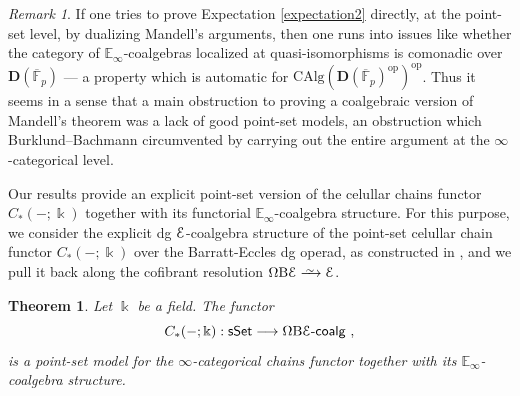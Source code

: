 \documentclass[a4paper,12pt]{amsart}
\renewcommand{\mathcal}{\EuScript}
\newtheorem{theoremintro}{Theorem}
\theoremstyle{plain}
\theoremstyle{definition}
\theoremstyle{remark}
\newtheorem{remark}[theorem]{\sc Remark}%
\newcommand{\qi}{\xrightarrow{ \,\smash{\raisebox{-0.65ex}{\ensuremath{\scriptstyle\sim}}}\,}}
\newcommand{\kk}{\Bbbk}
\begin{document}
\begin{remark}If one tries to prove Expectation \ref{expectation2} directly, at the point-set level, by dualizing Mandell's arguments, then one runs into issues like whether the category of $\mathbb E_\infty$-coalgebras localized at quasi-isomorphisms is comonadic over $\mathbf D(\overline{\mathbb{F}}_p)$ --- a property which is automatic for $\mathrm{CAlg}(\mathbf D(\overline{\mathbb{F}}_p)^{\mathrm{op}})^{\mathrm{op}}$. Thus it seems in a sense that a main obstruction to proving a coalgebraic version of Mandell's theorem was a lack of good point-set models, an obstruction which Burklund--Bachmann circumvented by carrying out the entire argument at the $\infty$-categorical level.  \end{remark}

Our results provide an explicit point-set version of the celullar chains functor $C_*(-;\kk)$ together with its functorial $\mathbb{E}_\infty$-coalgebra structure. For this purpose, we consider the explicit dg $\mathcal{E}$-coalgebra structure of the point-set celullar chain functor $C_*(-;\kk)$ over the Barratt-Eccles dg operad, as constructed in \cite{BergerFresse}, and we pull it back along the cofibrant resolution $\Omega \mathrm{B} \mathcal{E} \qi \mathcal{E}$. 

\begin{theoremintro}\label{thm: presenting chains with the coalgebra structure}
Let $\kk$ be a field. The functor 
\[
C_*(-;\kk): \mathsf{sSet} \longrightarrow \Omega \mathrm{B} \mathcal{E}\text{-}\mathsf{coalg}~, 
\]
is a point-set model for the $\infty$-categorical chains functor together with its $\mathbb{E}_\infty$-coalgebra structure.
\end{theoremintro}
\end{document}
